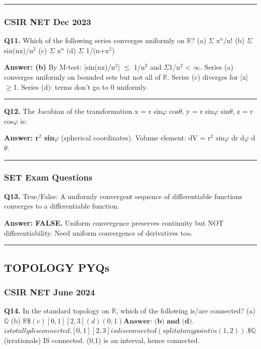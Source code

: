 \documentclass[12pt,a4paper,openany]{book}
\begin{document}
{{\bigskip\noindent\rule{\textwidth}{0.4pt}\bigskip

\subsubsection{CSIR NET Dec 2023}
\textbf{Q11.} Which of the following series converges uniformly on $\mathbb{R}$?
(a) $\Sigma$ x$^n$/n!  (b) $\Sigma$ sin(nx)/n$^2$  (c) $\Sigma$ x$^n$  (d) $\Sigma$ 1/(n+x$^2$)

\textbf{Answer: (b)} By M-test: |sin(nx)/n$^2$| $\leq$ 1/n$^2$ and $\Sigma$1/n$^2$ < $\infty$. Series (a) converges uniformly on bounded sets but not all of $\mathbb{R}$. Series (c) diverges for |x|$\geq$1. Series (d): terms don't go to 0 uniformly.

\bigskip\noindent\rule{\textwidth}{0.4pt}\bigskip

\textbf{Q12.} The Jacobian of the transformation x = r sin$\varphi$ cos$\theta$, y = r sin$\varphi$ sin$\theta$, z = r cos$\varphi$ is:

\textbf{Answer: r$^2$ sin$\varphi$} (spherical coordinates). Volume element: dV = r$^2$ sin$\varphi$ dr d$\varphi$ d$\theta$.

\bigskip\noindent\rule{\textwidth}{0.4pt}\bigskip

\subsubsection{SET Exam Questions}
\textbf{Q13.} True/False: A uniformly convergent sequence of differentiable functions converges to a differentiable function.

\textbf{Answer: FALSE.} Uniform convergence preserves continuity but NOT differentiability. Need uniform convergence of derivatives too.

\bigskip\noindent\rule{\textwidth}{0.4pt}\bigskip

\subsection{ TOPOLOGY PYQs}

\subsubsection{CSIR NET June 2024}
\textbf{Q14.} In the standard topology on $\mathbb{R}$, which of the following is/are connected?
(a) $\mathbb{Q}$  (b) $\mathbb{R}$\$$  (c) [0,1]$\cup$[2,3]  (d) (0,1)

\textbf{Answer: (b) and (d).} $$ is totally disconnected. [0,1]$\cup$[2,3] is disconnected (split at any point in (1,2)). $$\$\mathbb{Q}$ (irrationals) IS connected. (0,1) is an interval, hence connected.

}}
\end{document}
